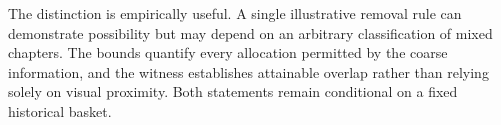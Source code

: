 \documentclass[11pt,a4paper]{article}
\begin{document}
The distinction is empirically useful. A single illustrative removal rule can demonstrate possibility but may depend on an arbitrary classification of mixed chapters. The bounds quantify every allocation permitted by the coarse information, and the witness establishes attainable overlap rather than relying solely on visual proximity. Both statements remain conditional on a fixed historical basket.
\end{document}
